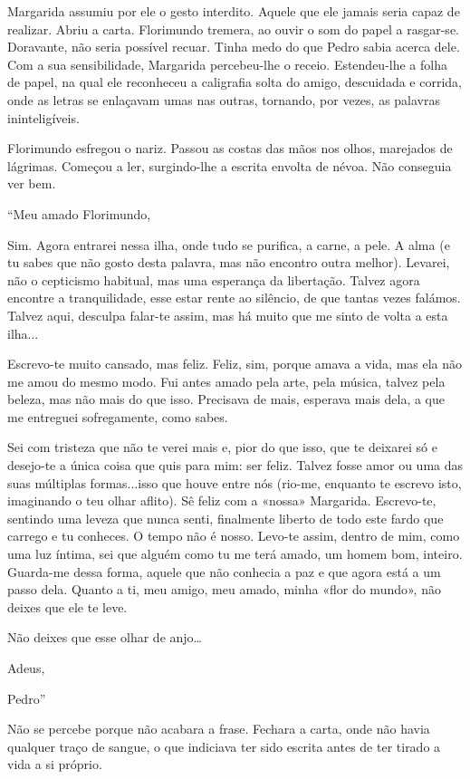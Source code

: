 Margarida assumiu por ele o gesto interdito. Aquele que ele jamais seria
capaz de realizar. Abriu a carta. Florimundo tremera, ao ouvir o som do
papel a rasgar-se. Doravante, não seria possível recuar. Tinha medo do
que Pedro sabia acerca dele. Com a sua sensibilidade, Margarida
percebeu-lhe o receio. Estendeu-lhe a folha de papel, na qual ele
reconheceu a caligrafia solta do amigo, descuidada e corrida, onde as
letras se enlaçavam umas nas outras, tornando, por vezes, as palavras
ininteligíveis.

Florimundo esfregou o nariz. Passou as costas das mãos nos olhos,
marejados de lágrimas. Começou a ler, surgindo-lhe a escrita envolta de
névoa. Não conseguia ver bem.

``Meu amado Florimundo,

Sim. Agora entrarei nessa ilha, onde tudo se purifica, a carne, a pele.
A alma (e tu sabes que não gosto desta palavra, mas não encontro outra
melhor). Levarei, não o cepticismo habitual, mas uma esperança da
libertação. Talvez agora encontre a tranquilidade, esse estar rente ao
silêncio, de que tantas vezes falámos. Talvez aqui, desculpa falar-te
assim, mas há muito que me sinto de volta a esta ilha...

Escrevo-te muito cansado, mas feliz. Feliz, sim, porque amava a vida,
mas ela não me amou do mesmo modo. Fui antes amado pela arte, pela
música, talvez pela beleza, mas não mais do que isso. Precisava de mais,
esperava mais dela, a que me entreguei sofregamente, como sabes.

Sei com tristeza que não te verei mais e, pior do que isso, que te
deixarei só e desejo-te a única coisa que quis para mim: ser feliz.
Talvez fosse amor ou uma das suas múltiplas formas...isso que houve
entre nós (rio-me, enquanto te escrevo isto, imaginando o teu olhar
aflito). Sê feliz com a «nossa» Margarida. Escrevo-te, sentindo uma
leveza que nunca senti, finalmente liberto de todo este fardo que
carrego e tu conheces. O tempo não é nosso. Levo-te assim, dentro de
mim, como uma luz íntima, sei que alguém como tu me terá amado, um homem
bom, inteiro. Guarda-me dessa forma, aquele que não conhecia a paz e que
agora está a um passo dela. Quanto a ti, meu amigo, meu amado, minha
«flor do mundo», não deixes que ele te leve.

Não deixes que esse olhar de anjo\ldots{}

Adeus,

Pedro''

Não se percebe porque não acabara a frase. Fechara a carta, onde não
havia qualquer traço de sangue, o que indiciava ter sido escrita antes
de ter tirado a vida a si próprio.

